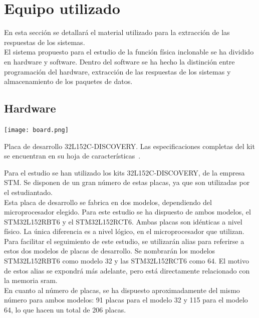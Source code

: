 \documentclass[spanish]{template/minim}
\begin{document}
\section{Equipo utilizado}\label{sec:setup}

En esta sección se detallará el material utilizado para la extracción de las respuestas de los sistemas.\\

El sistema propuesto para el estudio de la función física inclonable se ha dividido en hardware y software. Dentro del software se ha hecho la distinción entre programación del hardware, extracción de las respuestas de los sistemas y almacenamiento de los paquetes de datos.\\

\subsection{Hardware}\label{sec:desc_boards}

\begin{marginfigure}
    \centering
    \texttt{[image: board.png]}
    \caption[Placa de desarrollo 32L152C-DISCOVERY]{
        Placa de desarrollo 32L152C-DISCOVERY. Las especificaciones completas del kit se encuentran en su hoja de características~\cite{discovery}.\label{fig:board}}
\end{marginfigure}

Para el estudio se han utilizado los kits 32L152C-DISCOVERY, de la empresa STM. Se disponen de un gran número de estas placas, ya que son utilizadas por el estudiantado.\\

Esta placa de desarrollo se fabrica en dos modelos, dependiendo del microprocesador elegido. Para este estudio se ha dispuesto de ambos modelos, el STM32L152RBT6 y el STM32L152RCT6. Ambas placas son idénticas a nivel físico. La única diferencia es a nivel lógico, en el microprocesador que utilizan.\\

Para facilitar el seguimiento de este estudio, se utilizarán alias para referirse a estos dos modelos de placas de desarrollo. Se nombrarán los modelos STM32L152R{\color{accent}B}T6 como modelo {\color{accent}32} y las STM32L152R{\color{accent}C}T6 como {\color{accent}64}. El motivo de estos alias se expondrá más adelante, pero está directamente relacionado con la memoria \gls{sram}.\\

En cuanto al número de placas, se ha dispuesto aproximadamente del mismo número para ambos modelos: {\color{accent}91} placas para el modelo {\color{accent}32} y {\color{accent}115} para el modelo {\color{accent}64}, lo que hacen un total de {\color{accent}206} placas.\\
\end{document}
